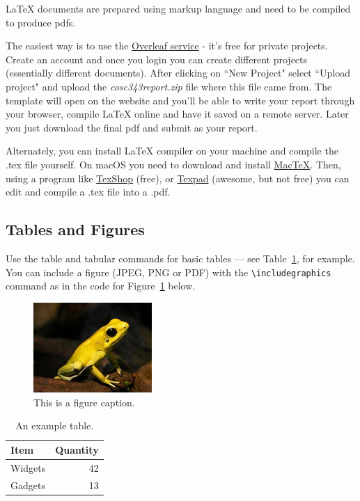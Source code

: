 \documentclass[12pt]{article}
\begin{document}
\LaTeX{} documents are prepared using markup language and need to be compiled to produce pdfs.  

The easiest way is to use the \href{https://www.overleaf.com}{Overleaf service} - it's free for private projects.  Create an account and once you login you can create different projects (essentially different documents).  After clicking on ``New Project" select ``Upload project" and upload the \textit{cosc343report.zip} file where this file came from.  The template will open on the website and you'll be able to write your report through your browser, compile LaTeX online and have it saved on a remote server.  Later you just download the final pdf and submit as your report.    

Alternately, you can install LaTeX compiler on your machine and compile the .tex file yourself.  On macOS you need to download and install \href{http://www.tug.org/mactex/downloading.html}{MacTeX}.  Then, using a program like \href{http://pages.uoregon.edu/koch/texshop/}{TexShop} (free), or \href{https://www.texpad.com/}{Texpad} (awesome, but not free) you can edit and compile a .tex file into a .pdf.


\subsection{Tables and Figures}

Use the table and tabular commands for basic tables --- see Table~\ref{tab:widgets}, for example. You can include a figure (JPEG, PNG or PDF) with the \verb$\includegraphics$ command as in the code for Figure~\ref{fig:frog} below.

\begin{figure}
\centering
\includegraphics[width=0.4\textwidth]{figures/frog.jpg}
\caption{\label{fig:frog}This is a figure caption.}
\end{figure}

\begin{table}
\centering
\begin{tabular}{l|r}
Item & Quantity \\\hline
Widgets & 42 \\
Gadgets & 13
\end{tabular}
\caption{\label{tab:widgets}An example table.}
\end{table}
\end{document}
